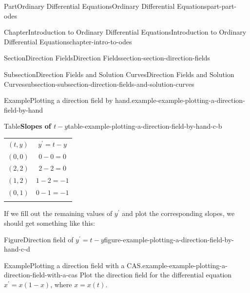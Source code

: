 \documentclass[twoside,10pt,]{book}
\newcommand{\tabularfont}{\relax}
\numberwithin{equation}{part}
\newcommand{\hrulethin}  {\noalign{\hrule height 0.04em}}
\newcommand{\hrulethick} {\noalign{\hrule height 0.11em}}
\begin{document}
\begin{partptx}{Part}{Ordinary Differential Equations}{}{Ordinary Differential Equations}{}{}{part-part-odes}
\begin{chapterptx}{Chapter}{Introduction to Ordinary Differential Equations}{}{Introduction to Ordinary Differential Equations}{}{}{chapter-intro-to-odes}
\begin{sectionptx}{Section}{Direction Fields}{}{Direction Fields}{}{}{section-section-direction-fields}
\begin{subsectionptx}{Subsection}{Direction Fields and Solution Curves}{}{Direction Fields and Solution Curves}{}{}{subsection-subsection-direction-fields-and-solution-curves}
\begin{example}{Example}{Plotting a direction field by hand.}{example-example-plotting-a-direction-field-by-hand}
\begin{tableptx}{Table}{\textbf{Slopes of \(t-y\)}}{table-example-plotting-a-direction-field-by-hand-c-b}{}%
\centering%
{\tabularfont%
\begin{tabular}{cc}\hrulethick
\((t,y)\)&\(y^\prime = t-y\)\tabularnewline\hrulethin
\((0,0)\)&\(0-0 = 0\)\tabularnewline\hrulethin
\((2,2)\)&\(2-2=0\)\tabularnewline\hrulethin
\((1,2)\)&\(1-2 = -1\)\tabularnewline\hrulethin
\((0,1)\)&\(0-1=-1\)\tabularnewline\hrulethick
\end{tabular}
}%
\end{tableptx}%
If we fill out the remaining values of \(y^\prime\) and plot the corresponding slopes, we should get something like this:%
\begin{figureptx}{Figure}{Direction field of \(y^\prime = t-y\)}{figure-example-plotting-a-direction-field-by-hand-c-d}{}%
\begin{image}{0.25}{0.5}{0.25}{}%
%
\end{image}%
\tcblower
\end{figureptx}%
\end{example}
\begin{example}{Example}{Plotting a direction field with a CAS.}{example-example-plotting-a-direction-field-with-a-cas}%
Plot the direction field for the differential equation \(x^\prime = x(1-x)\), where \(x=x(t)\).%
\par\smallskip%

\end{example}
\end{subsectionptx}
\end{sectionptx}
\end{chapterptx}
\end{partptx}
\end{document}

